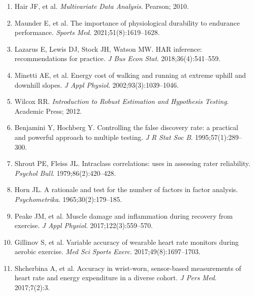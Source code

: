 \documentclass[12pt]{article}
\begin{document}
\begin{enumerate}
  Magazine; 2024.
  \item Hair JF, et al. \textit{Multivariate Data Analysis}. Pearson; 2010.
  \item Maunder E, et al. The importance of physiological durability to
  endurance performance. \textit{Sports Med}. 2021;51(8):1619--1628.
  \item Lazarus E, Lewis DJ, Stock JH, Watson MW. HAR inference:
  recommendations for practice. \textit{J Bus Econ Stat}.
  2018;36(4):541--559.
  \item Minetti AE, et al. Energy cost of walking and running at extreme
  uphill and downhill slopes. \textit{J Appl Physiol}.
  2002;93(3):1039--1046.
  \item Wilcox RR. \textit{Introduction to Robust Estimation and Hypothesis
  Testing}. Academic Press; 2012.
  \item Benjamini Y, Hochberg Y. Controlling the false discovery rate: a
  practical and powerful approach to multiple testing. \textit{J R Stat Soc
  B}. 1995;57(1):289--300.
  \item Shrout PE, Fleiss JL. Intraclass correlations: uses in assessing
  rater reliability. \textit{Psychol Bull}. 1979;86(2):420--428.
  \item Horn JL. A rationale and test for the number of factors in factor
  analysis. \textit{Psychometrika}. 1965;30(2):179--185.
  \item Peake JM, et al. Muscle damage and inflammation during recovery
  from exercise. \textit{J Appl Physiol}. 2017;122(3):559--570.
  \item Gillinov S, et al. Variable accuracy of wearable heart rate
  monitors during aerobic exercise. \textit{Med Sci Sports Exerc}.
  2017;49(8):1697--1703.
  \item Shcherbina A, et al. Accuracy in wrist-worn, sensor-based
  measurements of heart rate and energy expenditure in a diverse cohort.
  \textit{J Pers Med}. 2017;7(2):3.
\end{enumerate}
\end{document}
